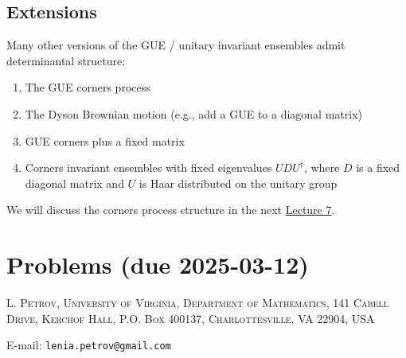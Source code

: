 \documentclass[letterpaper,11pt,oneside,reqno]{article}
\numberwithin{equation}{section}
\theoremstyle{definition}
\begin{document}
\subsection{Extensions}

Many other versions of the GUE / unitary invariant ensembles admit determinantal structure:
\begin{enumerate}
	\item The GUE corners process \cite{johansson2006eigenvalues}
    \item The Dyson Brownian motion (e.g., add a GUE to a diagonal matrix)
			\cite{nagao1998multilevel}
		\item GUE corners plus a fixed matrix \cite{Ferrari2014PerturbedGUE}
    \item Corners invariant ensembles with fixed eigenvalues $UDU^\dagger$, where $D$ is a fixed diagonal matrix and $U$ is Haar distributed
			on the unitary group \cite{Metcalfe2011GT}
	\end{enumerate}

We will discuss the corners process structure 
in the next
\href{https://lpetrov.cc/rmt25/rmt25-notes/rmt2025-l07.pdf}{Lecture 7}.






















\appendix
\setcounter{section}{5}

\section{Problems (due 2025-03-12)}









\medskip

\textsc{L. Petrov, University of Virginia, Department of Mathematics, 141 Cabell Drive, Kerchof Hall, P.O. Box 400137, Charlottesville, VA 22904, USA}

E-mail: \texttt{lenia.petrov@gmail.com}
\end{document}
